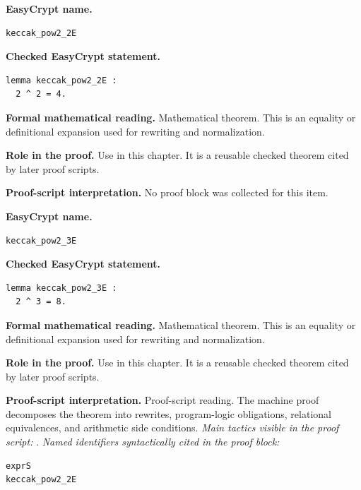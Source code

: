 \begin{formaltheorem}
\noindent\textbf{EasyCrypt name.}
\begin{lstlisting}[language=EasyCrypt,basicstyle=\ttfamily\scriptsize]
keccak_pow2_2E
\end{lstlisting}
\noindent\textbf{Checked EasyCrypt statement.}
\begin{lstlisting}[language=EasyCrypt,basicstyle=\ttfamily\scriptsize]
lemma keccak_pow2_2E :
  2 ^ 2 = 4.
\end{lstlisting}
\noindent\textbf{Formal mathematical reading.}
Mathematical theorem. This is an equality or definitional expansion used for rewriting and normalization.

\noindent\textbf{Role in the proof.}
Use in this chapter. It is a reusable checked theorem cited by later proof scripts.

\noindent\textbf{Proof-script interpretation.}
No proof block was collected for this item.

\end{formaltheorem}

\begin{formaltheorem}
\noindent\textbf{EasyCrypt name.}
\begin{lstlisting}[language=EasyCrypt,basicstyle=\ttfamily\scriptsize]
keccak_pow2_3E
\end{lstlisting}
\noindent\textbf{Checked EasyCrypt statement.}
\begin{lstlisting}[language=EasyCrypt,basicstyle=\ttfamily\scriptsize]
lemma keccak_pow2_3E :
  2 ^ 3 = 8.
\end{lstlisting}
\noindent\textbf{Formal mathematical reading.}
Mathematical theorem. This is an equality or definitional expansion used for rewriting and normalization.

\noindent\textbf{Role in the proof.}
Use in this chapter. It is a reusable checked theorem cited by later proof scripts.

\noindent\textbf{Proof-script interpretation.}
Proof-script reading. The machine proof decomposes the theorem into rewrites, program-logic obligations, relational equivalences, and arithmetic side conditions.
\emph{Main tactics visible in the proof script:} .
\emph{Named identifiers syntactically cited in the proof block:}
\begin{lstlisting}[language=EasyCrypt,basicstyle=\ttfamily\scriptsize]
exprS
keccak_pow2_2E
\end{lstlisting}

\end{formaltheorem}

